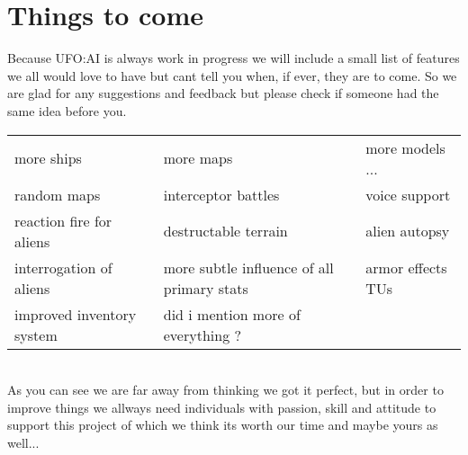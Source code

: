 \section{Things to come}
Because UFO:AI is always work in progress we will include a small list of features we all would love to have but cant tell you when, if ever, they are to come. So we are glad for any suggestions and feedback but please check if someone had the same idea before you.
\\
\begin{tabular}{lll}
more ships  & more maps & more models ...   \\ 
random maps & interceptor battles & voice support \\ 
reaction fire for aliens  & destructable terrain & alien autopsy \\ 
interrogation of aliens  & more subtle influence of all primary stats & armor effects TUs \\ 
improved inventory system & did i mention more of everything ? &  \\ 
\end{tabular} 
\\
As you can see we are far away from thinking we got it perfect, but in order to improve things we allways need individuals with passion, skill and attitude to support this project of which we think its worth our time and maybe yours as well...
